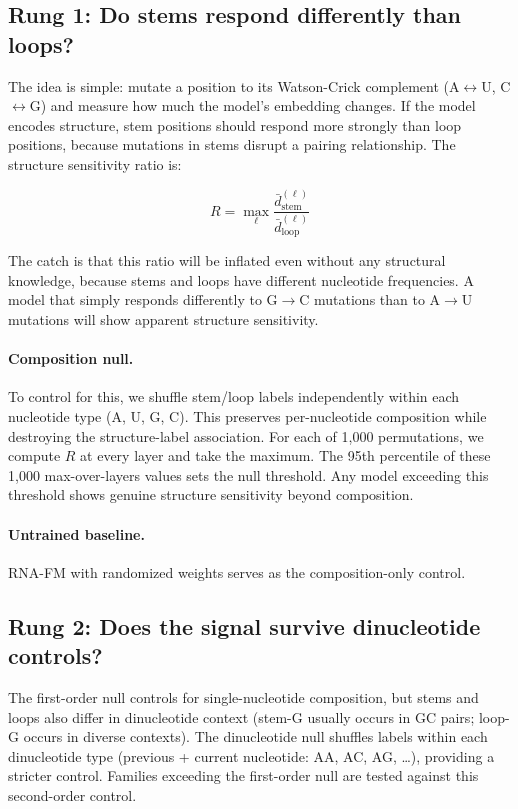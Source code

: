 \documentclass[11pt]{article}
\begin{document}
\subsection{Rung 1: Do stems respond differently than loops?}

The idea is simple: mutate a position to its Watson-Crick complement
(A$\leftrightarrow$U, C$\leftrightarrow$G) and measure how much the
model's embedding changes. If the model encodes structure, stem
positions should respond more strongly than loop positions, because
mutations in stems disrupt a pairing relationship. The structure
sensitivity ratio is:

\begin{equation}
R = \max_{\ell} \frac{\bar{d}_{\text{stem}}^{(\ell)}}{\bar{d}_{\text{loop}}^{(\ell)}}
\end{equation}

The catch is that this ratio will be inflated even without any
structural knowledge, because stems and loops have different
nucleotide frequencies. A model that simply responds differently to
G$\to$C mutations than to A$\to$U mutations will show apparent
structure sensitivity.

\paragraph{Composition null.}
To control for this, we shuffle stem/loop labels independently within
each nucleotide type (A, U, G, C). This preserves per-nucleotide
composition while destroying the structure-label association. For each
of 1,000 permutations, we compute $R$ at every layer and take the
maximum. The 95th percentile of these 1,000 max-over-layers values
sets the null threshold. Any model exceeding this threshold shows
genuine structure sensitivity beyond composition.

\paragraph{Untrained baseline.}
RNA-FM with randomized weights serves as the composition-only control.

\subsection{Rung 2: Does the signal survive dinucleotide controls?}

The first-order null controls for single-nucleotide composition, but
stems and loops also differ in dinucleotide context (stem-G usually
occurs in GC pairs; loop-G occurs in diverse contexts). The
dinucleotide null shuffles labels within each dinucleotide type
(previous + current nucleotide: AA, AC, AG, \ldots), providing a
stricter control. Families exceeding the first-order null are tested
against this second-order control.
\end{document}
